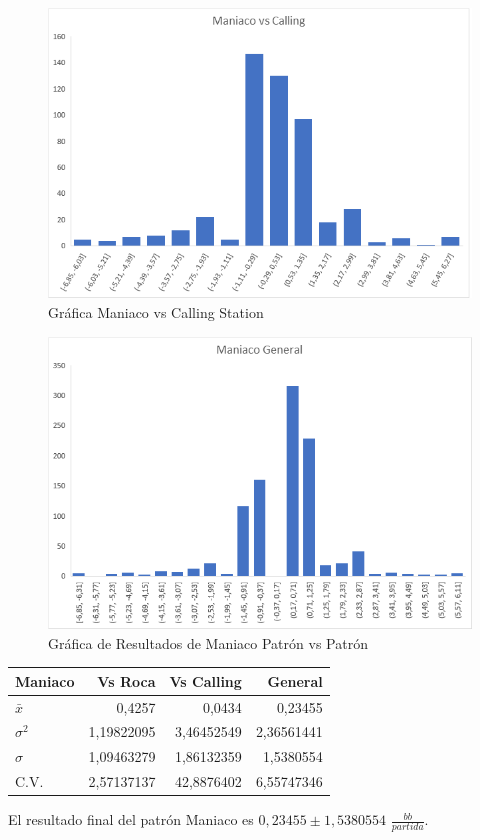 \begin{figure}[h]
\centering
\includegraphics[width=.65\textwidth]{figuras/MvC.png}   
\caption{Gráfica Maniaco vs Calling Station}
\label{fig:MvC}
\end{figure}

\begin{figure}[h]
\centering
\includegraphics[width=.65\textwidth]{figuras/MG.png}   
\caption{Gráfica de Resultados de Maniaco Patrón vs Patrón}
\label{fig:MGR}
\end{figure}

\vspace{5mm} %
\vspace{5mm} %
\begin{longtable}[c]{lrrr}
\hline
Maniaco & Vs Roca & Vs Calling & General \\ \hline
$\bar{x}$ & 0,4257 & 0,0434 & 0,23455 \\ 
$\sigma^2 $& 1,19822095 & 3,46452549 & 2,36561441 \\ 
$\sigma$ & 1,09463279 & 1,86132359 & 1,5380554 \\
C.V. & 2,57137137 & 42,8876402 & 6,55747346 \\ \hline
\end{longtable}

El resultado final del patrón Maniaco es $0,23455\pm1,5380554$ $\frac{bb}{partida}$.

